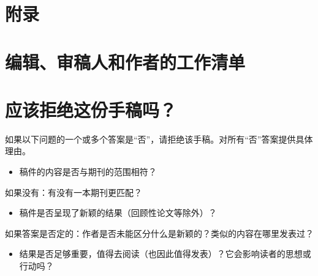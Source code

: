 \section*{附录
}
\section*{编辑、审稿人和作者的工作清单}
\section*{应该拒绝这份手稿吗？}
如果以下问题的一个或多个答案是“否”，请拒绝该手稿。对所有“否”答案提供具体理由。

\begin{itemize}
\item 稿件的内容是否与期刊的范围相符？
\end{itemize}

如果没有：有没有一本期刊更匹配？

\begin{itemize}
\item 稿件是否呈现了新颖的结果（回顾性论文等除外）？
\end{itemize}

如果答案是否定的：作者是否未能区分什么是新颖的？类似的内容在哪里发表过？

\begin{itemize}
\item 结果是否足够重要，值得去阅读（也因此值得发表）？它会影响读者的思想或行动吗？
\end{itemize}

